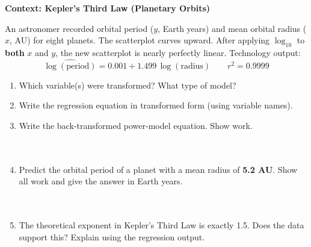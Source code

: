 \documentclass[10pt]{article}
\begin{document}
\vspace{0.12in}

\begin{tcolorbox}[colback=white, colframe=black!40, boxrule=0.8pt, arc=2mm,
    left=4mm, right=4mm, top=3mm, bottom=3mm,
    title={\textbf{Tier A --- Approaching Proficiency}}, fonttitle=\bfseries, halign title=center]
\small

\textbf{Context: Kepler's Third Law (Planetary Orbits)}

An astronomer recorded orbital period ($y$, Earth years) and mean orbital radius ($x$,
AU) for eight planets. The scatterplot curves upward. After applying $\log_{10}$ to
\textbf{both} $x$ and $y$, the new scatterplot is nearly perfectly linear. Technology output:
\[
  \widehat{\log(\text{period})} = 0.001 + 1.499\,\log(\text{radius}) \qquad r^2 = 0.9999
\]

\vspace{8pt}

\begin{enumerate}[leftmargin=1.6em, itemsep=0.18in]

  \item Which variable(s) were transformed? \blank{5cm} \quad What type of model?
        \blank{3cm}

  \item Write the regression equation in transformed form (using variable names).\\[6pt]
        \writeline

  \item Write the back-transformed power-model equation. Show work.\\[8pt]
        \writeline\\[3pt]\writeline\\[3pt]\writeline

  \item Predict the orbital period of a planet with a mean radius of \textbf{5.2 AU}.
        Show all work and give the answer in Earth years.\\[8pt]
        \writeline\\[3pt]\writeline\\[3pt]\writeline

  \item The theoretical exponent in Kepler's Third Law is exactly 1.5. Does the data
        support this? Explain using the regression output.\\[8pt]
        \writeline\\[3pt]\writeline

\end{enumerate}
\end{tcolorbox}
\end{document}
